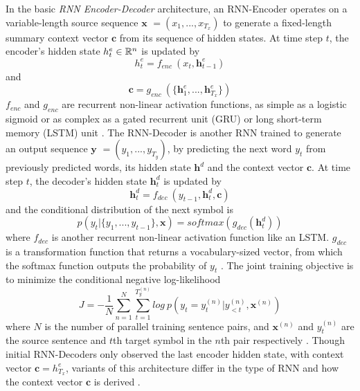\documentclass[a4paper]{article}
\begin{document}
In the basic \emph{RNN Encoder-Decoder} architecture, an RNN-Encoder operates on a variable-length source sequence $\mathbf x$ $=(x_1,...,x_{T_x})$ to generate a fixed-length summary context vector $\mathbf c$ from its sequence of hidden states. At time step $t$, the encoder's hidden state $h^e_t \in {\Bbb R^n}$ is updated by
\begin{equation}
  h^e_t = f_{enc}\ (x_t, \mathbf h^e_{t-1})
  \label{eq1}
\end{equation}
and
\begin{equation}
  \mathbf c = g_{enc}\ (\{\mathbf h^e_1,...,\mathbf h^e_{T_x} \})
  \label{eq2}
\end{equation}
 $f_{enc}$ and $g_{enc}$ are recurrent non-linear activation functions, as simple as a logistic sigmoid or as complex as a gated recurrent unit (GRU) or long short-term memory (LSTM) unit \cite{bahdanau2014neural}. The RNN-Decoder is another RNN trained to generate an output sequence $\mathbf y$ $=(y_1,...,y_{T_y})$, by predicting the next word $y_{t}$ from previously predicted words, its hidden state $\mathbf h^d$ and the context vector $\mathbf c$. At time step $t$, the decoder's hidden state $\mathbf h^d_t$ is updated by
\begin{equation}
  \mathbf h^d_t = f_{dec}\ (y_{t-1}, \mathbf h^d_t, \mathbf c)
  \label{eq3}
\end{equation}
and the conditional distribution of the next symbol is
\begin{equation}
  p(y_t|\{y_1,...,y_{t-1}\}, \mathbf x) = softmax(g_{dec}(\mathbf h^d_t))
  \label{eq4}
\end{equation}
where $f_{dec}$ is another recurrent non-linear activation function like an LSTM. $g_{dec}$ is a transformation function that returns a vocabulary-sized vector, from which the softmax function outputs the probability of $y_t$ \cite{luong2015effective}. The joint training objective is to minimize the conditional negative log-likelihood
\begin{equation}
 	J = - \frac{1}{N}\sum\limits_{n=1}^{N}\sum\limits_{t=1}^{T^{(n)}_y} log\ p(y_t = y^{(n)}_t|y^{(n)}_{<t}, \mathbf x^{(n)})
  \label{eq5}
\end{equation}
where $N$ is the number of parallel training sentence pairs, and $\mathbf x^{(n)}$ and $y^{(n)}_{t}$ are the source sentence and $t$th target symbol in the $n$th pair respectively \cite{luong2015effective}. Though initial RNN-Decoders only observed the last encoder hidden state, with context vector $\mathbf c = h^e_{T_x}$, variants of this architecture differ in the type of RNN and how the context vector $\mathbf c$ is derived \cite{bahdanau2014neural, cho2014learning}. 
\end{document}
